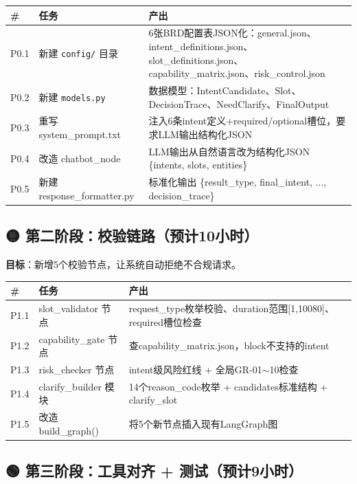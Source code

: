 \documentclass[12pt,a4paper]{ctexart}
\begin{document}
\begin{table}[h]
\centering
\begin{tabular}{@{}llp{6cm}@{}}
\toprule
\textbf{\#} & \textbf{任务} & \textbf{产出} \\
\midrule
P0.1 & 新建 \texttt{config/} 目录 & 6张BRD配置表JSON化：general.json、intent\_definitions.json、slot\_definitions.json、capability\_matrix.json、risk\_control.json \\
P0.2 & 新建 \texttt{models.py} & 数据模型：IntentCandidate、Slot、DecisionTrace、NeedClarify、FinalOutput \\
P0.3 & 重写 system\_prompt.txt & 注入6条intent定义+required/optional槽位，要求LLM输出结构化JSON \\
P0.4 & 改造 chatbot\_node & LLM输出从自然语言改为结构化JSON \{intents, slots, entities\} \\
P0.5 & 新建 response\_formatter.py & 标准化输出 \{result\_type, final\_intent, ..., decision\_trace\} \\
\bottomrule
\end{tabular}
\end{table}

\subsection{🟡 第二阶段：校验链路（预计10小时）}

\textbf{目标}：新增5个校验节点，让系统自动拒绝不合规请求。

\begin{table}[h]
\centering
\begin{tabular}{@{}llp{6cm}@{}}
\toprule
\textbf{\#} & \textbf{任务} & \textbf{产出} \\
\midrule
P1.1 & slot\_validator 节点 & request\_type枚举校验、duration范围[1,10080]、required槽位检查 \\
P1.2 & capability\_gate 节点 & 查capability\_matrix.json，block不支持的intent \\
P1.3 & risk\_checker 节点 & intent级风险红线 + 全局GR-01$\sim$10检查 \\
P1.4 & clarify\_builder 模块 & 14个reason\_code枚举 + candidates标准结构 + clarify\_slot \\
P1.5 & 改造 build\_graph() & 将5个新节点插入现有LangGraph图 \\
\bottomrule
\end{tabular}
\end{table}

\subsection{🟢 第三阶段：工具对齐 + 测试（预计9小时）}
\end{document}
